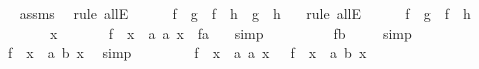 \begin{isabellebody}
\ \ \ \ \isamarkupfalse%
\ assms\ \isamarkupfalse%
\ {\isacharparenleft}rule\ allE{\isacharparenright}\isanewline
\ \ \isamarkupfalse%
\ {}{\isacharcolon}\ {\isachardoublequoteopen}\ {\isacharparenleft}f\ {\isasymcirc}\ {\isacharquery}g\ {\isacharequal}\ f\ {\isasymcirc}\ {\isacharquery}h\ {\isasymlongrightarrow}\ {\isacharquery}g\ {\isacharequal}\ {\isacharquery}h{\isacharparenright}{\isachardoublequoteclose}\ \ \isamarkupfalse%
\ {\isacharparenleft}rule\ allE{\isacharparenright}\ \isanewline
\ \ \isamarkupfalse%
\ {}{\isacharcolon}\ {\isachardoublequoteopen}f\ {\isasymcirc}\ {\isacharquery}g\ {\isacharequal}\ f\ {\isasymcirc}\ {\isacharquery}h{\isachardoublequoteclose}\ \isanewline
\ \ \isamarkupfalse%
\ \isanewline
\ \ \ \ \isamarkupfalse%
\ x\isanewline
\ \ \ \ \isamarkupfalse%
\ {\isachardoublequoteopen}\ {\isacharparenleft}f\ {\isasymcirc}\ {\isacharparenleft}{\isasymlambda}x\ {\isacharcolon}{\isacharcolon}\ {\isacharprime}a{\isachardot}\ a{\isacharparenright}{\isacharparenright}\ x\ {\isacharequal}\ f{\isacharparenleft}a{\isacharparenright}\ {\isachardoublequoteclose}\ \isamarkupfalse%
\ simp\isanewline
\ \ \ \ \isamarkupfalse%
\ \isamarkupfalse%
\ {\isachardoublequoteopen}{\isachardot}{\isachardot}{\isachardot}\ {\isacharequal}\ f{\isacharparenleft}b{\isacharparenright}{\isachardoublequoteclose}\ \isamarkupfalse%
\ {}\ \isamarkupfalse%
\ simp\isanewline
\ \ \ \ \isamarkupfalse%
\ \isamarkupfalse%
\ {\isachardoublequoteopen}{\isachardot}{\isachardot}{\isachardot}\ {\isacharequal}\ \ {\isacharparenleft}f\ {\isasymcirc}\ {\isacharparenleft}{\isasymlambda}x\ {\isacharcolon}{\isacharcolon}\ {\isacharprime}a{\isachardot}\ b{\isacharparenright}{\isacharparenright}\ x{\isachardoublequoteclose}\ \isamarkupfalse%
\ simp\isanewline
\ \ \ \ \isamarkupfalse%
\ \isamarkupfalse%
\ {\isachardoublequoteopen}\ {\isacharparenleft}f\ {\isasymcirc}\ {\isacharparenleft}{\isasymlambda}x\ {\isacharcolon}{\isacharcolon}\ {\isacharprime}a{\isachardot}\ a{\isacharparenright}{\isacharparenright}\ x\ {\isacharequal}\ \ {\isacharparenleft}f\ {\isasymcirc}\ {\isacharparenleft}{\isasymlambda}x\ {\isacharcolon}{\isacharcolon}\ {\isacharprime}a{\isachardot}\ b{\isacharparenright}{\isacharparenright}\ x{\isachardoublequoteclose}\isanewline
\ \ \ \ \ \ \isamarkupfalse%

\end{isabellebody}
